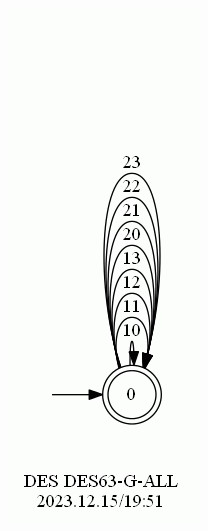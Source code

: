 \documentclass{article}
\begin{document}
\begin{figure}[h!]
  \centering
  \begin{subfigure}{0.2\linewidth}
    \includegraphics[width=\linewidth]{assets/DES63-G-ALL.jpg}

\end{subfigure}
\end{figure}
\end{document}
